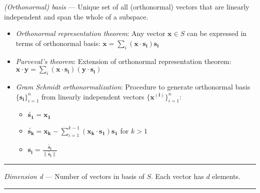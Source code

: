 \emph{(Orthonormal) basis} --- Unique set of all (orthonormal) vectors that are linearly independent and span the whole of a subspace.
\begin{itemize}
    \item \emph{Orthonormal representation theorem}: Any vector $\boldsymbol{x} \in S$ can be expressed in terms of orthonormal basis: $\boldsymbol{x} = \sum_i (\boldsymbol{x} \cdot \boldsymbol{s_i})\boldsymbol{s_i}$
    \item \emph{Parveval's theorem}: Extension of orthonormal representation theorem: $\boldsymbol{x} \cdot \boldsymbol{y} = \sum_i (\boldsymbol{x} \cdot \boldsymbol{s_i})(\boldsymbol{y} \cdot \boldsymbol{s_i})$
    \item \emph{Gram Schmidt orthonormalization}: Procedure to generate orthonormal basis $\{\boldsymbol{s_i}\}_{i=1}^n$ from linearly independent vectors $\{\boldsymbol{x^{(i)}}\}_{i=1}^n$:
    \begin{itemize}
        \item $\boldsymbol{\tilde{s_1}} = \boldsymbol{x_1}$
        \item $\boldsymbol{\tilde{s_k}} = \boldsymbol{x_k} - \sum_{i=1}^{k-1} (\boldsymbol{x_k} \cdot \boldsymbol{s_1})\boldsymbol{s_1}$ for $k > 1$
        \item $\boldsymbol{s_i} = \frac{\boldsymbol{\tilde{s_i}}}{\|\boldsymbol{\tilde{s_i}}\|}$
    \end{itemize}    
\end{itemize}

{\color{lightgray}\hrule height 0.001mm}

\emph{Dimension d} --- Number of vectors in basis of $S$. Each vector has $d$ elements.

{\color{lightgray}\hrule height 0.001mm}

